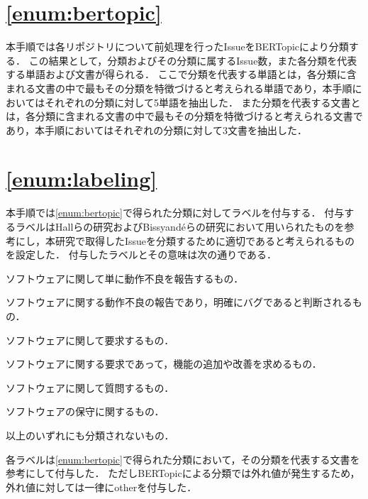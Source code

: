 \documentclass[main]{subfiles}
\begin{document}
\section{\ref{enum:bertopic}}
\label{sec:bertopic}

本手順では各リポジトリについて前処理を行ったIssueをBERTopicにより分類する．
この結果として，分類およびその分類に属するIssue数，また各分類を代表する単語および文書が得られる．
ここで分類を代表する単語とは，各分類に含まれる文書の中で最もその分類を特徴づけると考えられる単語であり，本手順においてはそれぞれの分類に対して5単語を抽出した．
また分類を代表する文書とは，各分類に含まれる文書の中で最もその分類を特徴づけると考えられる文書であり，本手順においてはそれぞれの分類に対して3文書を抽出した．

\section{\ref{enum:labeling}}
\label{sec:labeling}

本手順では\ref{enum:bertopic}で得られた分類に対してラベルを付与する．
付与するラベルはHallらの研究およびBissyand{\'e}らの研究\cite{bissyande:2013}において用いられたものを参考にし，本研究で取得したIssueを分類するために適切であると考えられるものを設定した．
付与したラベルとその意味は次の通りである．

\begin{description}[labelwidth=6em, leftmargin=6em]
	\item[error] ソフトウェアに関して単に動作不良を報告するもの．
	\item[bug] ソフトウェアに関する動作不良の報告であり，明確にバグであると判断されるもの．
	\item[requirement] ソフトウェアに関して要求するもの．
	\item[improvement] ソフトウェアに関する要求であって，機能の追加や改善を求めるもの．
	\item[question] ソフトウェアに関して質問するもの．
	\item[maintenance] ソフトウェアの保守に関するもの．
	\item[other] 以上のいずれにも分類されないもの．
\end{description}

各ラベルは\ref{enum:bertopic}で得られた分類において，その分類を代表する文書を参考にして付与した．
ただしBERTopicによる分類では外れ値が発生するため，外れ値に対しては一律にotherを付与した．
\end{document}
